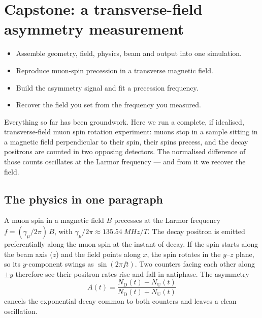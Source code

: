 \chapter{Capstone: a transverse-field asymmetry measurement}
\label{ch:capstone}

\begin{willdo}
\begin{itemize}
  \item Assemble geometry, field, physics, beam and output into one simulation.
  \item Reproduce muon-spin precession in a transverse magnetic field.
  \item Build the asymmetry signal and fit a precession frequency.
  \item Recover the field you set from the frequency you measured.
\end{itemize}
\end{willdo}

Everything so far has been groundwork. Here we run a complete, if idealised, transverse-field muon spin rotation experiment: muons stop in a sample sitting in a magnetic field perpendicular to their spin, their spins precess, and the decay positrons are counted in two opposing detectors. The normalised difference of those counts oscillates at the Larmor frequency --- and from it we recover the field.

\section{The physics in one paragraph}
A muon spin in a magnetic field \(B\) precesses at the Larmor frequency \(f=(\gamma_\mu/2\pi)\,B\), with \(\gamma_\mu/2\pi\approx\SI{135.54}{MHz/T}\). The decay positron is emitted preferentially along the muon spin at the instant of decay. If the spin starts along the beam axis (\(z\)) and the field points along \(x\), the spin rotates in the \(y\)--\(z\) plane, so its \(y\)-component swings as \(\sin(2\pi f t)\). Two counters facing each other along \(\pm y\) therefore see their positron rates rise and fall in antiphase. The asymmetry
\[
A(t)=\frac{N_\mathrm{D}(t)-N_\mathrm{U}(t)}{N_\mathrm{D}(t)+N_\mathrm{U}(t)}
\]
cancels the exponential decay common to both counters and leaves a clean oscillation.

